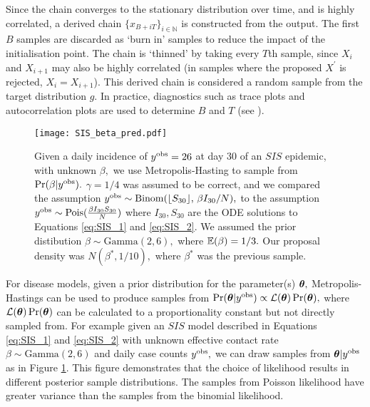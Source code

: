 Since the chain converges to the stationary distribution over time, and is
highly correlated,
a derived chain $\{x_{B + iT}\}_{i \in \mathbb{N}}$ is constructed
from the output. The
first $B$ samples are discarded as `burn in' samples to reduce the impact
of the initialisation point. The chain is `thinned' by taking every $T$th sample,
since $X_i$ and $X_{i + 1}$ may also be highly correlated (in samples where
the proposed $X^\prime$ is rejected, $X_i = X_{i + 1}$).
This derived chain is considered a
random sample from the target distribution $g.$
In practice, diagnostics such as trace plots and autocorrelation plots are used
to determine $B$ and $T$ (see
\cite[Chapter 11]{gelman_bayesian_2014}).

\begin{figure}[htbp]
    \centering
    \texttt{[image: SIS\_beta\_pred.pdf]}
    \caption{
        Given a daily incidence of $y^{\mathrm{obs}} = 26$ at day 30 of an $SIS$ epidemic,
        with unknown $\beta,$ we use Metropolis-Hasting to
        sample from $\Pr(\beta | y^{\mathrm{obs}}).$
        $\gamma = 1/4$ was assumed to be correct, and we compared the assumption
        $y^{\mathrm{obs}}
            \sim \mathrm{Binom}(\lfloor S_{30} \rfloor,\, \beta I_{30}/N),$
        to the assumption $y^{\mathrm{obs}} \sim \operatorname{Pois}(\frac{\beta I_{30} S_{30}}{N})$
        where $I_{30}, S_{30}$ are the ODE solutions to Equations
        \ref{eq:SIS_1} and \ref{eq:SIS_2}. We assumed the prior distibution
        $\beta\sim \mathrm{Gamma}(2, 6),$ where $\operatorname{\mathbb{E}}(\beta) = 1/3.$ Our proposal
        density was $N(\beta^\ast, 1/10),$ where $\beta^\ast$ was the previous
        sample.
    }
    \label{fig:SIS_MH_R}
\end{figure}

For disease models, given a prior distribution for the parameter(s) $\bm{\theta},$
Metropolis-Hastings can be used to produce samples from
$\Pr(\bm{\theta} | y^{\mathrm{obs}}) \propto \mathcal{L}(\bm{\theta})\Pr(\bm{\theta}),$ where
$\mathcal{L}(\bm{\theta})\Pr(\bm{\theta})$ can be calculated to a proportionality
constant but not directly
sampled from. For example given an $SIS$ model described in Equations
\ref{eq:SIS_1} and \ref{eq:SIS_2} with unknown effective contact rate
$\beta \sim \mathrm{Gamma}(2, 6)$ and daily case counts $y^{\mathrm{obs}},$ we can
draw samples from $\bm{\theta} | y^{\mathrm{obs}}$ as in Figure \ref{fig:SIS_MH_R}. This
figure demonstrates that the choice of likelihood results in different posterior
sample distributions. The samples from Poisson likelihood have greater variance
than the samples from the binomial likelihood.

